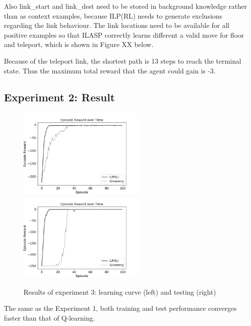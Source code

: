 Also link\_start and link\_dest need to be stored in background knowledge rather than as context examples,
because ILP(RL) needs to generate exclusions regarding the link behaviour.
The link locations need to be available for all positive examples so that ILASP correctly learns different a valid move for floor and teleport, which is shown in Figure XX below.

Because of the teleport link, the shortest path is 13 steps to reach the terminal state. Thus the maximum total reward that the agent could gain is -3.

\subsection{Experiment 2: Result}
\label{subsec:experiment2_result}
    
\begin{figure}[!htb]
\centerline{
\includegraphics[width=0.55\textwidth]{./figures/experiment2_training}
\includegraphics[width=0.55\textwidth]{./figures/experiment2_test}
}
\caption{Results of experiment 3: learning curve (left) and testing (right)}
\label{experiment2_training}
\end{figure}

The same as the Experiment 1, both training and test performance converges faster than that of Q-learning.



